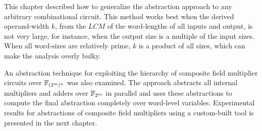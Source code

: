 This chapter described how to generalize the abstraction approach to any arbitrary
combinational circuit. This method works best when the derived operand-width $k$, from the $LCM$ of the 
word-lengths of all inputs and output, is not very large, for instance, when the output size is a 
multiple of the input sizes. When all word-sizes are relatively prime,
$k$ is a product of all sizes, which can make the analysis overly bulky.

An abstraction technique for exploiting the hierarchy of composite field multiplier circuits over
${\mathbb{F}}_{(2^m)^n} $
was also examined. The approach abstracts all internal multipliers and adders over ${\mathbb{F}}_{2^m}$ in 
parallel and uses these abstractions to compute the final abstraction completely over
word-level variables. Experimental results for abstractions of composite field multipliers using a
custom-built tool is presented in the next chapter.
